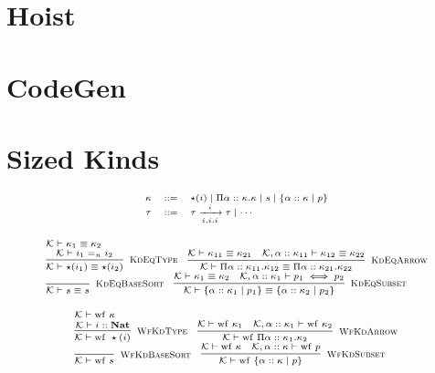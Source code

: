 \documentclass[fleqn]{article}
\begin{document}
\section{Hoist}

\section{CodeGen}

\section{Sized Kinds}

\[
\scriptsize
\begin{array}{rcl}
	\kappa & ::= & \star(i) \mid \Pi \alpha :: \kappa. \kappa \mid s \mid \{ \alpha :: \kappa \mid p \} \\
	\tau & ::= & \tau \xrightarrow[i,i,i]{i} \tau \mid \cdots
\end{array}
\]

\[
\scriptsize
\begin{array}{l}
	\mathcal{K} \vdash \kappa_1 \equiv \kappa_2 \\
	\infer[\textsc{KdEqType}]{\mathcal{K} \vdash \star(i_1) \equiv \star(i_2)}{\mathcal{K} \vdash i_1 =_n i_2} \hspace{1em}
	\infer[\textsc{KdEqArrow}]{\mathcal{K} \vdash \Pi \alpha :: \kappa_{11}. \kappa_{12} \equiv \Pi \alpha :: \kappa_{21}. \kappa_{22}}{\mathcal{K} \vdash \kappa_{11} \equiv \kappa_{21} & \mathcal{K}, \alpha :: \kappa_{11} \vdash \kappa_{12} \equiv \kappa_{22}} \\
	\infer[\textsc{KdEqBaseSort}]{\mathcal{K} \vdash s \equiv s}{} \hspace{1em}
	\infer[\textsc{KdEqSubset}]{\mathcal{K} \vdash \{ \alpha :: \kappa_1 \mid p_1 \} \equiv \{ \alpha :: \kappa_2 \mid p_2 \} }{\mathcal{K} \vdash \kappa_1 \equiv \kappa_2 & \mathcal{K},\alpha::\kappa_1 \vdash p_1 \iff p_2}
\end{array}
\]

\[
\scriptsize
\begin{array}{l}
	\mathcal{K} \vdash \mathrm{wf}~\kappa \\
	\infer[\textsc{WfKdType}]{\mathcal{K} \vdash \mathrm{wf}~\star(i)}{\mathcal{K} \vdash i :: \mathbf{Nat}} \hspace{1em}
	\infer[\textsc{WfKdArrow}]{\mathcal{K} \vdash \mathrm{wf}~\Pi \alpha :: \kappa_1. \kappa_2}{\mathcal{K} \vdash \mathrm{wf}~\kappa_1 & \mathcal{K},\alpha::\kappa_1 \vdash \mathrm{wf}~\kappa_2} \\
	\infer[\textsc{WfKdBaseSort}]{\mathcal{K} \vdash \mathrm{wf}~s}{} \hspace{1em}
	\infer[\textsc{WfKdSubset}]{\mathcal{K} \vdash \mathrm{wf}~\{  \alpha :: \kappa \mid p \}}{\mathcal{K} \vdash \mathrm{wf}~\kappa & \mathcal{K},\alpha::\kappa \vdash \mathrm{wf}~p}
\end{array}
\]
\end{document}
